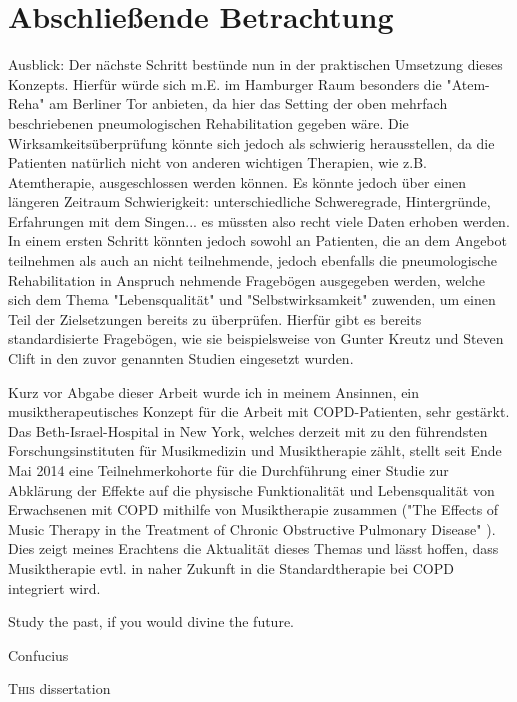 \chapter{Abschließende Betrachtung} %
Ausblick: Der nächste Schritt bestünde nun in der praktischen Umsetzung dieses Konzepts. Hierfür würde sich m.E. im Hamburger Raum besonders die "Atem-Reha" am Berliner Tor anbieten, da hier das Setting der oben mehrfach beschriebenen pneumologischen Rehabilitation gegeben wäre. Die Wirksamkeitsüberprüfung könnte sich jedoch als schwierig herausstellen, da die Patienten natürlich nicht von anderen wichtigen Therapien, wie z.B. Atemtherapie, ausgeschlossen werden können. Es könnte jedoch über einen längeren Zeitraum 
Schwierigkeit: unterschiedliche Schweregrade, Hintergründe, Erfahrungen mit dem Singen... es müssten also recht viele Daten erhoben werden. In einem ersten Schritt könnten jedoch sowohl an Patienten, die an dem Angebot teilnehmen als auch an nicht teilnehmende, jedoch ebenfalls die pneumologische Rehabilitation in Anspruch nehmende Fragebögen ausgegeben werden, welche sich dem Thema "Lebensqualität" und "Selbstwirksamkeit" zuwenden, um einen Teil der Zielsetzungen bereits zu überprüfen. Hierfür gibt es bereits standardisierte Fragebögen, wie sie beispielsweise von Gunter Kreutz und Steven Clift in den zuvor genannten Studien eingesetzt wurden.



Kurz vor Abgabe dieser Arbeit wurde ich in meinem Ansinnen, ein musiktherapeutisches Konzept für die Arbeit mit COPD-Patienten, sehr gestärkt. Das Beth-Israel-Hospital in New York, welches derzeit mit zu den führendsten Forschungsinstituten für Musikmedizin und Musiktherapie zählt, stellt seit Ende Mai 2014 eine Teilnehmerkohorte für die Durchführung einer Studie zur Abklärung der Effekte auf die physische Funktionalität und Lebensqualität von Erwachsenen mit COPD mithilfe von Musiktherapie zusammen ("The Effects of Music Therapy in the Treatment of Chronic Obstructive Pulmonary Disease" ). Dies zeigt meines Erachtens die Aktualität dieses Themas und lässt hoffen, dass Musiktherapie evtl. in naher Zukunft in die Standardtherapie bei COPD integriert wird.



\setlength{\epigraphwidth}{7.5cm}
\epigraph{Study the past, if you would divine the future.}{Confucius}

\ifpdf
    \graphicspath{{X/figures/PNG/}{X/figures/PDF/}{X/figures/}}
\else
    \graphicspath{{X/figures/EPS/}{X/figures/}}
\fi

\lettrine{T}{his} dissertation 

\newpage\thispagestyle{empty}
